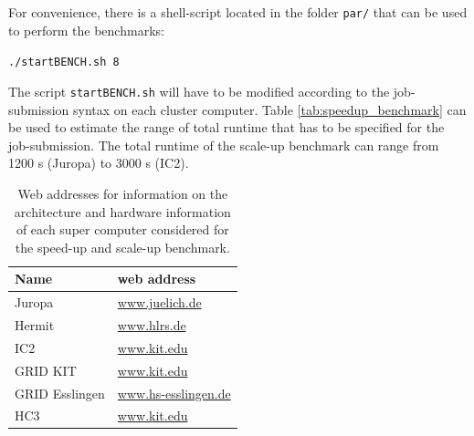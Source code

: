 \documentclass[11pt,onecolumn,oneside]{article}
\begin{document}
For convenience, there is a shell-script located in the folder  \lstinline{par/} that can be used to perform the benchmarks:

 \lstinline{./startBENCH.sh 8}

The script  \lstinline{startBENCH.sh} will have to be modified according to the job-submission syntax on each cluster computer. Table \ref{tab:speedup_benchmark} can be used to estimate the range of total runtime that has to be specified for the job-submission. The total runtime of the scale-up benchmark can range from 1200 s (Juropa) to 3000 s (IC2).

\begin{table}[hbt]
\begin{center}
\begin{tabular}{|l|l|} \hline 
Name &  web address\\ \hline
Juropa &  \href{http://www.fz-juelich.de/ias/jsc/EN/Expertise/Supercomputers/JUROPA/JUROPA_node.html}{www.juelich.de}   \\
Hermit &  \href{http://www.hlrs.de/systems/platforms/cray-xe6-hermit/}{www.hlrs.de} \\
IC2    &  \href{http://www.scc.kit.edu/dienste/ic2.php}{www.kit.edu}  \\ 
GRID KIT & \href{http://www.scc.kit.edu/dienste/7349.php}{www.kit.edu} \\
GRID Esslingen & \href{http://www.hs-esslingen.de/de/hochschule/fakultaeten/informationstechnik/it-forschung/bwgrid.html}{www.hs-esslingen.de} \\
HC3 & \href{http://www.scc.kit.edu/dienste/hc3.php}{www.kit.edu} \\ \hline
\end{tabular} 
\caption{Web addresses for information on the architecture and hardware information of each super computer considered for the speed-up and scale-up benchmark.}
\label{tab:cluster}
\end{center}
\end{table}
\end{document}
